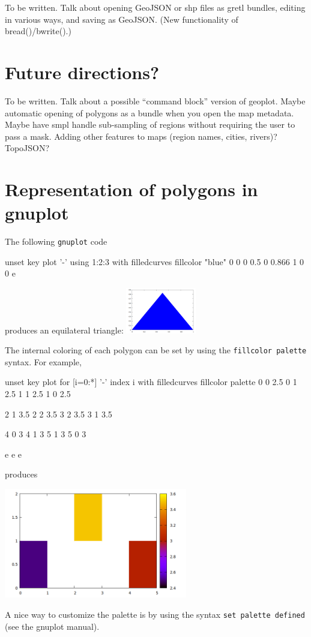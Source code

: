 \documentclass{article}
\begin{document}
To be written. Talk about opening GeoJSON or shp files as gretl
bundles, editing in various ways, and saving as GeoJSON. (New
functionality of bread()/bwrite().)

\section{Future directions?}
\label{sec:future}

To be written. Talk about a possible ``command block'' version of
geoplot. Maybe automatic opening of polygons as a bundle when you open
the map metadata. Maybe have smpl handle sub-sampling of regions
without requiring the user to pass a mask. Adding other features to
maps (region names, cities, rivers)? TopoJSON?


\clearpage
\appendix

\section{Representation of polygons in gnuplot}
\label{sec:gnuplot}

The
following \texttt{gnuplot} code
\begin{code}
  unset key
  plot '-' using 1:2:3 with filledcurves fillcolor "blue"
  0 0 0
  0.5 0 0.866
  1 0 0
  e
\end{code}
produces an equilateral triangle: \includegraphics[height=2cm]{triangle.png}

\medskip

The internal coloring of each polygon can be set by using the
\texttt{fillcolor palette} syntax. For example,
\begin{scriptsize}
\begin{code}
unset key
plot for [i=0:*] '-' index i with filledcurves fillcolor palette
	0 0 2.5
	0 1 2.5
	1 1 2.5
	1 0 2.5

	2 1 3.5
	2 2 3.5
	3 2 3.5
	3 1 3.5

	4 0 3
	4 1 3
	5 1 3
	5 0 3

e
e
e
\end{code}
\end{scriptsize}
produces
\begin{center}
  \includegraphics[width=0.6\textwidth]{squares}
\end{center}

A nice way to customize the palette is by using the syntax \texttt{set
palette defined} (see the gnuplot manual).
\end{document}
